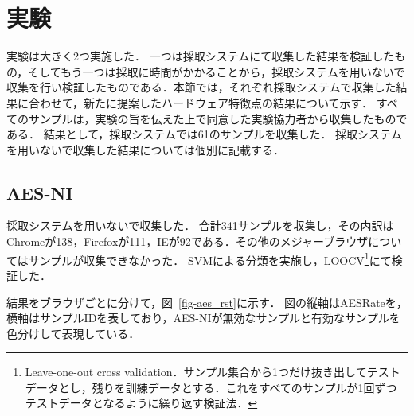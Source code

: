 \newpage
\section{実験}
実験は大きく2つ実施した．
一つは採取システムにて収集した結果を検証したもの，そしてもう一つは採取に時間がかかることから，採取システムを用いないで収集を行い検証したものである．本節では，それぞれ採取システムで収集した結果に合わせて，新たに提案したハードウェア特徴点の結果について示す．
すべてのサンプルは，実験の旨を伝えた上で同意した実験協力者から収集したものである．
結果として，採取システムでは61のサンプルを収集した．
採取システムを用いないで収集した結果については個別に記載する．

\subsection{AES-NI}
採取システムを用いないで収集した．
合計341サンプルを収集し，その内訳はChromeが138，Firefoxが111，IEが92である．その他のメジャーブラウザについてはサンプルが収集できなかった．
SVMによる分類を実施し，LOOCV\footnote{Leave-one-out cross validation．サンプル集合から1つだけ抜き出してテストデータとし，残りを訓練データとする．これをすべてのサンプルが1回ずつテストデータとなるように繰り返す検証法．}にて検証した．

結果をブラウザごとに分けて，図~\ref{fig-aes_rst}に示す．
図の縦軸はAESRateを，横軸はサンプルIDを表しており，AES-NIが無効なサンプルと有効なサンプルを色分けして表現している．

